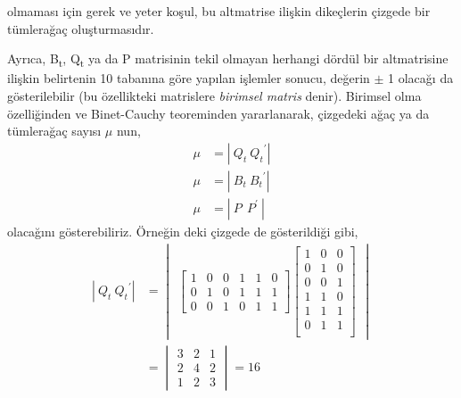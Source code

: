 \documentclass[11pt]{amsbook}
\begin{document}
\begin{theorem}
olmaması için gerek ve yeter koşul, bu altmatrise ilişkin dikeçlerin çizgede bir tümlerağaç oluşturmasıdır.
\end{theorem}

Ayrıca, B\textsubscript{t}, Q\textsubscript{t} ya da P matrisinin tekil olmayan herhangi dördül bir altmatrisine ilişkin belirtenin 10 tabanına göre yapılan işlemler sonucu, değerin $\pm$ 1 olacağı da gösterilebilir (bu özellikteki matrislere \textit{birimsel matris} denir). Birimsel olma özelliğinden ve Binet-Cauchy teoreminden yararlanarak, çizgedeki ağaç ya da tümlerağaç sayısı $\mu$ nun,
\begin{align*}
    \mu &= |\ Q_{t} \ {Q_{t}}^\prime | \\
    \mu &= |\ B_{t} \ {B_{t}}^\prime | \\
    \mu &= |\ P \ \  P^\prime \ |
\end{align*}
olacağını gösterebiliriz. Örneğin  deki çizgede  de gösterildiği gibi,
\begin{align*}
    |\ Q_{t} \ {Q_{t}}^\prime | &= 
    \begin{vmatrix}
        \begin{bmatrix}
            1 & 0 & 0 & 1 & 1 & 0 \\
            0 & 1 & 0 & 1 & 1 & 1 \\
            0 & 0 & 1 & 0 & 1 & 1
        \end{bmatrix}
        \begin{bmatrix}
            1 & 0 & 0 \\
            0 & 1 & 0 \\
            0 & 0 & 1 \\
            1 & 1 & 0 \\
            1 & 1 & 1 \\
            0 & 1 & 1 \\
        \end{bmatrix}
    \end{vmatrix} \\ &= 
    \begin{vmatrix}
        3 & 2 & 1 \\
        2 & 4 & 2 \\
        1 & 2 & 3 
    \end{vmatrix} = 16
\end{align*}
\end{document}

